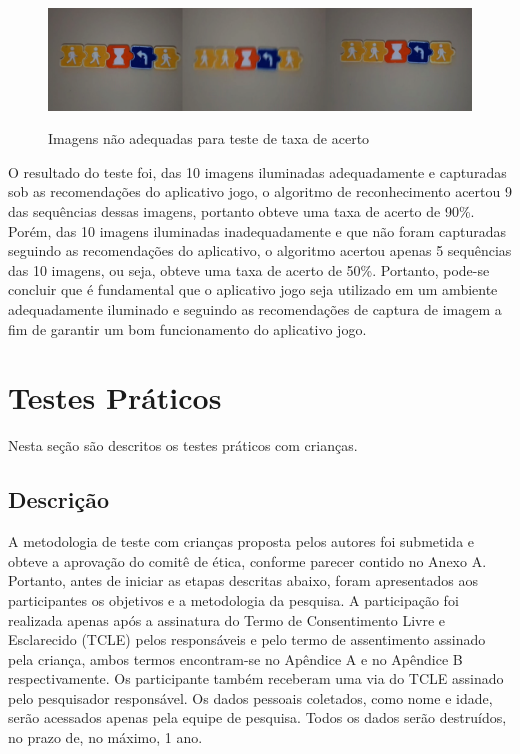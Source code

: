 \begin{figure}[H]
    \caption{Imagens não adequadas para teste de taxa de acerto}
    \centering
    \includegraphics[width=15cm]{Imagens/Cap5/tta_ruim.PNG}
    \label{figura:tta_ruim}
\end{figure}

O resultado do teste foi, das 10 imagens iluminadas adequadamente e capturadas sob as recomendações do aplicativo jogo, o algoritmo de reconhecimento acertou 9 das sequências dessas imagens, portanto obteve uma taxa de acerto de 90\%. Porém, das 10 imagens iluminadas inadequadamente e que não foram capturadas seguindo as recomendações do aplicativo, o algoritmo acertou apenas 5 sequências das 10 imagens, ou seja, obteve uma taxa de acerto de 50\%. Portanto, pode-se concluir que é fundamental que o aplicativo jogo seja utilizado em um ambiente adequadamente iluminado e seguindo as recomendações de captura de imagem a fim de garantir um bom funcionamento do aplicativo jogo.


\section{Testes Práticos}

Nesta seção são descritos os testes práticos com crianças.

\subsection{\textbf{Descrição}}


A metodologia de teste com crianças proposta pelos autores foi submetida e obteve a aprovação do comitê de ética, conforme parecer contido no Anexo A. Portanto, antes de iniciar as etapas descritas abaixo, foram apresentados aos participantes os objetivos e a metodologia da pesquisa. A participação foi  realizada apenas após a assinatura do Termo de Consentimento Livre e Esclarecido (TCLE) pelos responsáveis e pelo termo de assentimento assinado pela criança, ambos termos encontram-se no Apêndice A e no Apêndice B respectivamente. Os participante também receberam uma via do TCLE assinado pelo pesquisador responsável. Os dados pessoais coletados, como nome e idade, serão acessados apenas pela equipe de pesquisa. Todos os dados serão destruídos, no prazo de, no máximo, 1 ano.

